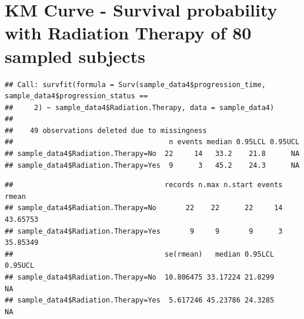 \documentclass[
  11pt,
]{article}
\newenvironment{Shaded}{\begin{snugshade}}{\end{snugshade}}
\newcommand{\AttributeTok}[1]{\textcolor[rgb]{0.77,0.63,0.00}{#1}}
\newcommand{\DecValTok}[1]{\textcolor[rgb]{0.00,0.00,0.81}{#1}}
\newcommand{\FunctionTok}[1]{\textcolor[rgb]{0.00,0.00,0.00}{#1}}
\newcommand{\NormalTok}[1]{#1}
\newcommand{\OtherTok}[1]{\textcolor[rgb]{0.56,0.35,0.01}{#1}}
\newcommand{\SpecialCharTok}[1]{\textcolor[rgb]{0.00,0.00,0.00}{#1}}
\begin{document}
\newpage
\section{KM Curve - Survival probability with Radiation Therapy of 80 sampled subjects}

\begin{Shaded}
\end{Shaded}

\begin{verbatim}
## Call: survfit(formula = Surv(sample_data4$progression_time, sample_data4$progression_status == 
##     2) ~ sample_data4$Radiation.Therapy, data = sample_data4)
## 
##    49 observations deleted due to missingness 
##                                     n events median 0.95LCL 0.95UCL
## sample_data4$Radiation.Therapy=No  22     14   33.2    21.8      NA
## sample_data4$Radiation.Therapy=Yes  9      3   45.2    24.3      NA
\end{verbatim}

\begin{Shaded}
\end{Shaded}

\begin{verbatim}
##                                    records n.max n.start events    rmean
## sample_data4$Radiation.Therapy=No       22    22      22     14 43.65753
## sample_data4$Radiation.Therapy=Yes       9     9       9      3 35.85349
##                                    se(rmean)   median 0.95LCL 0.95UCL
## sample_data4$Radiation.Therapy=No  10.806475 33.17224 21.8299      NA
## sample_data4$Radiation.Therapy=Yes  5.617246 45.23786 24.3285      NA
\end{verbatim}
\end{document}
